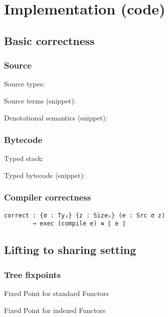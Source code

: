 \section{Implementation (code)}

    \subsection{Basic correctness}

        \begin{frame}[fragile]
            \frametitle{Source}

            Source types:

            Source terms (snippet):

            Denotational semantics (snippet):
\end{frame}

        \begin{frame}[fragile]
            \frametitle{Bytecode}

            Typed stack:

            Typed bytecode (snippet):
\end{frame}

        \begin{frame}[fragile]
            \frametitle{Compiler correctness}
            \begin{verbatim}
correct : {σ : Tyₛ} {z : Sizeₛ} (e : Src σ z)
        → exec (compile e) ≡ ⟦ e ⟧
            \end{verbatim}
        \end{frame}


    \subsection{Lifting to sharing setting}
        \begin{frame}[fragile]
            \frametitle{Tree fixpoints}
            Fixed Point for standard Functors
            
            Fixed Point for indexed Functors
        \end{frame}

